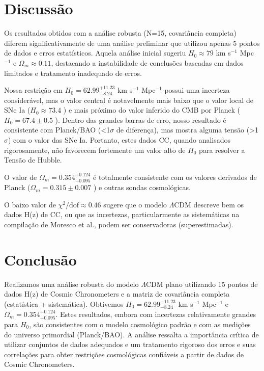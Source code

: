 \documentclass[11pt,a4paper]{article}
\begin{document}
\section{Discussão}
Os resultados obtidos com a análise robusta (N=15, covariância completa) diferem significativamente de uma análise preliminar que utilizou apenas 5 pontos de dados e erros estatísticos. Aquela análise inicial sugeriu $H_0 \approx 79$ km s$^{-1}$ Mpc$^{-1}$ e $\Omega_m \approx 0.11$, destacando a instabilidade de conclusões baseadas em dados limitados e tratamento inadequado de erros.

Nossa restrição em $H_0 = 62.99^{+11.23}_{-8.24}$ km s$^{-1}$ Mpc$^{-1}$ possui uma incerteza considerável, mas o valor central é notavelmente mais baixo que o valor local de SNe Ia ($H_0 \approx 73.4$ \cite{ref:shoes}) e mais próximo do valor inferido do CMB por Planck ($H_0 = 67.4 \pm 0.5$ \cite{ref:planck2018}). Dentro das grandes barras de erro, nosso resultado é consistente com Planck/BAO (<1$\sigma$ de diferença), mas mostra alguma tensão (>1$\sigma$) com o valor das SNe Ia. Portanto, estes dados CC, quando analisados rigorosamente, não favorecem fortemente um valor alto de $H_0$ para resolver a Tensão de Hubble.

O valor de $\Omega_m = 0.354^{+0.124}_{-0.095}$ é totalmente consistente com os valores derivados de Planck ($\Omega_m = 0.315 \pm 0.007$ \cite{ref:planck2018}) e outras sondas cosmológicas.

O baixo valor de $\chi^2 / \text{dof} \approx 0.46$ sugere que o modelo $\Lambda$CDM descreve bem os dados H(z) de CC, ou que as incertezas, particularmente as sistemáticas na compilação de Moresco et al., podem ser conservadoras (superestimadas).

\section{Conclusão}
Realizamos uma análise robusta do modelo $\Lambda$CDM plano utilizando 15 pontos de dados H(z) de Cosmic Chronometers e a matriz de covariância completa (estatística + sistemática). Obtivemos $H_0 = 62.99^{+11.23}_{-8.24}$ km s$^{-1}$ Mpc$^{-1}$ e $\Omega_m = 0.354^{+0.124}_{-0.095}$. Estes resultados, embora com incertezas relativamente grandes para $H_0$, são consistentes com o modelo cosmológico padrão e com as medições do universo primordial (Planck/BAO). A análise ressalta a importância crítica de utilizar conjuntos de dados adequados e um tratamento rigoroso dos erros e suas correlações para obter restrições cosmológicas confiáveis a partir de dados de Cosmic Chronometers.
\end{document}
